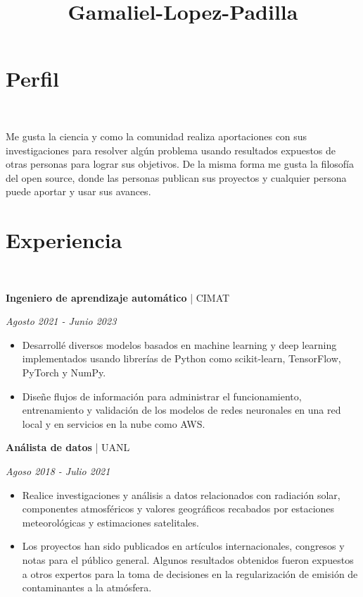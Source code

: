 \documentclass[a3paper]{adcv_color}
\title{Gamaliel-Lopez-Padilla}
\newcommand{\work}[3]{
	\begin{minipage}{0.75\linewidth}
		\textbf{#1} | #2
	\end{minipage}
	\begin{minipage}{0.25\linewidth}
		\begin{flushright}
			\textit{#3}
		\end{flushright}
	\end{minipage}
	\vspace{-1cm}
}
\begin{document}
\changefontsizes{14pt}
\section{Perfil}\\
\begin{addmargin}[0.5em]{0.2em}
	\begin{flushleft}
		Me gusta la ciencia y como la comunidad realiza  aportaciones con sus investigaciones para resolver algún problema usando resultados expuestos de otras personas para lograr sus objetivos. De la misma forma me gusta la filosofía del open source, donde las personas publican sus proyectos y cualquier persona puede aportar y usar sus avances.\\
	\end{flushleft}
\end{addmargin}

\section{Experiencia}\\
\begin{addmargin}[0.5em]{0.5em}
	\work{Ingeniero de aprendizaje automático}{CIMAT}{Agosto 2021 - Junio 2023}
	\begin{itemize}
		\item Desarrollé diversos modelos basados en machine learning y deep learning implementados usando librerías de Python como scikit-learn, TensorFlow, PyTorch y NumPy.
		\item Diseñe flujos de información para administrar el funcionamiento, entrenamiento y validación de los modelos de redes neuronales en una red local y en servicios en la nube como AWS.
	\end{itemize}
	\work{Análista de datos}{UANL}{Agoso 2018 - Julio 2021}
	\begin{itemize}
		\item Realice investigaciones y análisis a datos relacionados con radiación solar, componentes atmosféricos y valores geográficos recabados por estaciones meteorológicas y estimaciones satelitales.
		\item Los proyectos han sido publicados en artículos internacionales, congresos y notas para el público general. Algunos resultados obtenidos fueron expuestos a otros expertos para la toma de decisiones en la regularización de emisión de contaminantes a la atmósfera.
	\end{itemize}
\end{addmargin}
\end{document}
